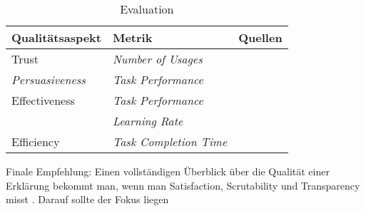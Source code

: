 \begin{table}[htb!]
    \begin{center}
        \begin{tabular}{|p{}|p{}|p{}|}
            \hline
            \textbf{Qualitätsaspekt} & \textbf{Metrik} & \textbf{Quellen} \\ \hline
            Trust & \textit{Number of Usages}  & \cite[vgl. ][]{tintarev2007survey} \\ \hline
            \textit{Persuasiveness} & \textit{Task Performance} & \cite[vgl.][]{tintarev2007survey} \\
            \hline
            Effectiveness & \textit{Task Performance}            &
                \cite{waa_evaluating_2021} \cite{mucha_interfaces_2021} \cite{tintarev_designing_nodate} \cite{abdulrahman_belief-based_2019} \cite{zolotas_towards_2019} \cite{martin_developing_2019} \cite{martin_evaluating_2021} \cite{gunning2019darpa} \cite{kunkel_let_2019} \cite{tintarev2007survey} \\
                 & \textit{Learning Rate}               &
                \cite{tintarev_designing_nodate} \cite{gunning2019darpa} \\
            \hline
            Efficiency & \textit{Task Completion Time} & \cite{tintarev2007survey} \\ \hline
        \end{tabular}
    \end{center}
    \caption{Evaluation}
    \label{tab:evaluation_quantitative_explanation_measures_indirect}
\end{table}

\smallskip

\noindent{}

\smallskip


Finale Empfehlung: Einen vollständigen Überblick über die Qualität einer Erklärung bekommt man, wenn man Satisfaction, Scrutability und Transparency misst \cite{balog_measuring_2020}. Darauf sollte der Fokus liegen 